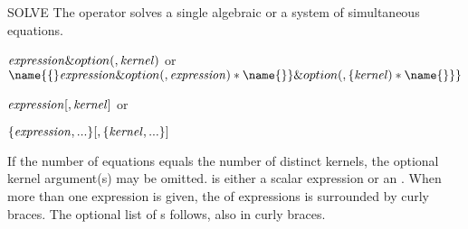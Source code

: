 \begin{Operator}[solve]{SOLVE}
The  operator solves a single algebraic  or a
system of simultaneous equations.
\begin{TEX}
\begin{Syntax}
\(\meta{expression}\&option(, \meta{kernel})\) or \\
 \(\name{\{}\meta{expression}\&option( ,\meta{expression})
 \optional\name{\}}
	  \&option(,\{\meta{kernel})\optional\name{\}\}}\)
\end{Syntax}
\end{TEX}
\begin{INFO}
{\begin{Syntax}
\(\meta{expression} [ , \meta{kernel}]\) or

\(\{\meta{expression},...\} [ ,\{ \meta{kernel} ,...\}] \)
\end{Syntax} 
}\end{INFO}

If the number of equations equals the number of distinct kernels, the
optional kernel argument(s) may be omitted.   is either a
scalar expression or an .  
When more than one expression is given,
the  of expressions is surrounded by curly braces.
The optional list
of s follows, also in curly braces.


\end{Operator}
